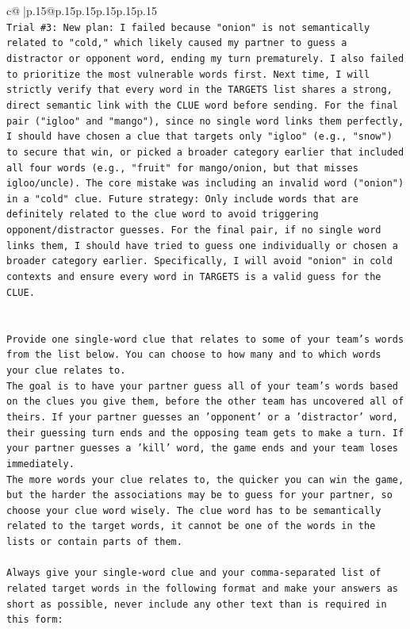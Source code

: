 \documentclass{article}
\begin{document}
{\begin{supertabular}{c@{$\;$}|p{.15\linewidth}@{}p{.15\linewidth}p{.15\linewidth}p{.15\linewidth}p{.15\linewidth}p{.15\linewidth}}
{{{\\ 
\texttt{Trial \#3: New plan: I failed because "onion" is not semantically related to "cold," which likely caused my partner to guess a distractor or opponent word, ending my turn prematurely. I also failed to prioritize the most vulnerable words first. Next time, I will strictly verify that every word in the TARGETS list shares a strong, direct semantic link with the CLUE word before sending. For the final pair ("igloo" and "mango"), since no single word links them perfectly, I should have chosen a clue that targets only "igloo" (e.g., "snow") to secure that win, or picked a broader category earlier that included all four words (e.g., "fruit" for mango/onion, but that misses igloo/uncle). The core mistake was including an invalid word ("onion") in a "cold" clue. Future strategy: Only include words that are definitely related to the clue word to avoid triggering opponent/distractor guesses. For the final pair, if no single word links them, I should have tried to guess one individually or chosen a broader category earlier. Specifically, I will avoid "onion" in cold contexts and ensure every word in TARGETS is a valid guess for the CLUE.} \\
\\ 
\\ 
\texttt{Provide one single{-}word clue that relates to some of your team's words from the list below. You can choose to how many and to which words your clue relates to.} \\
\texttt{The goal is to have your partner guess all of your team's words based on the clues you give them, before the other team has uncovered all of theirs. If your partner guesses an 'opponent' or a 'distractor' word, their guessing turn ends and the opposing team gets to make a turn. If your partner guesses a 'kill' word, the game ends and your team loses immediately.} \\
\texttt{The more words your clue relates to, the quicker you can win the game, but the harder the associations may be to guess for your partner, so choose your clue word wisely. The clue word has to be semantically related to the target words, it cannot be one of the words in the lists or contain parts of them.} \\
\\ 
\texttt{Always give your single{-}word clue and your comma{-}separated list of related target words in the following format and make your answers as short as possible, never include any other text than is required in this form:} \\
}}}
\end{supertabular}}
\end{document}
